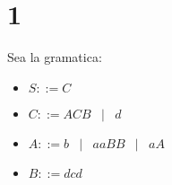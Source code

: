 \documentclass[12pt, fleqn]{article}                            %
\DeclareMathOperator \Space     {\quad}                         %
\DeclareMathOperator \MiniSpace {\;}                            %
\newcommand \Such           {\MiniSpace | \MiniSpace}           %
\theoremstyle{break}                                            %
\begin{document}
\restoregeometry                                                    %
\nopagecolor                                                        %




\tableofcontents{}
\label{sec:Index}

\clearpage


\clearpage
\section{1}

    Sea la gramatica:
    \begin{itemize}
        \item $S ::= C$
        \item $C ::= ACB \Such d$
        \item $A ::= b \Such aaBB \Such aA$
        \item $B ::= dcd$
    \end{itemize}
\end{document}
